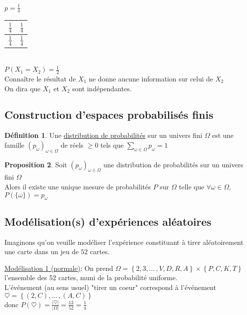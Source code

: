 \documentclass[10pt,a4paper]{article}
\theoremstyle{definition}
\newtheorem{proposition}{Proposition}[section]
\newtheorem{definition}[proposition]{Définition}
\begin{document}
$p = \frac{1}{4}$ \quad
\begin{tabular}{M{3em} | M{3em}}
$\frac{1}{4}$ & $\frac{1}{4}$ \\
\hline
$\frac{1}{4}$ & $\frac{1}{4}$ \\
\end{tabular} \\
$P(X_1 = X_2) = \frac{1}{2}$ \\
Connaître le résultat de $X_1$ ne donne aucune information sur celui de $X_2$ \\
On dira que $X_1$ et $X_2$ sont indépendantes.

\subsection{Construction d'espaces probabilisés finis}
\begin{definition}
Une \uline{distribution de probabilités} sur un univers fini $\Omega$ est une famille $(p_\omega)_{\omega \in \Omega}$ de réels $\geq 0$ tels que $\sum\limits_{\omega \in \Omega} p_\omega = 1$
\end{definition}
\begin{proposition}
Soit $(p_\omega)_{\omega \in \Omega}$ une distribution de probabilités sur un univers fini $\Omega$ \\
Alors il existe une unique mesure de probabilités $P$ sur $\Omega$ telle que $\forall \omega \in \Omega$, $P(\{ \omega \}) = p_\omega$
\end{proposition}

\subsection{Modélisation(s) d'expériences aléatoires}
\noindent Imaginons qu'on veuille modéliser l'expérience constituant à tirer aléatoirement une carte dans un jeu de $52$ cartes. \medskip

\noindent \uline{Modélisation 1 (normale)}: On prend $\Omega = \left\{ 2, 3, ...\,, V, D, R, A \right\} \times \left\{ P, C, K, T \right\}$ l'ensemble des 52 cartes, muni de la probabilité uniforme. \\
L'événement (au sens usuel) "tirer un coeur" correspond à l'événement $\heartsuit = \left\{ (2, C), ...\,, (A, C) \right\}$ \\
donc $P(\heartsuit) = \frac{\left| \heartsuit \right|}{\left| \Omega \right|} = \frac{13}{52} = \frac{1}{4}$ \medskip
\end{document}

